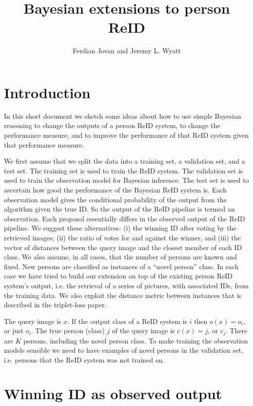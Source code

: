 \documentclass[10pt,a4paper,final]{article}
\title{Bayesian extensions to person ReID}
\author{Ferdian Jovan and Jeremy L. Wyatt}
\begin{document}
\maketitle

\section{Introduction}
In this short document we sketch some ideas about how to use simple Bayesian reasoning to change the outputs of a person ReID system, to change the performance measure, and to improve the performance of that ReID system given that performance measure.

We first assume that we split the data into a training set, a validation set, and a test set. The training set is used to train the ReID system. The validation set is used to train the observation model for Bayesian inference. The test set is used to ascertain how good the performance of the Bayesian ReID system is. Each observation model gives the conditional probability of the output from the algorithm given the true ID. So the output of the ReID pipeline is termed an observation. Each proposal essentially differs in the observed output of the ReID pipeline. We suggest these alternatives: (i) the winning ID after voting by the retrieved images; (ii) the ratio of votes for and against the winner, and (iii) the vector of distances between the query image and the closest member of each ID class. %
We also assume, in all cases, that the number of persons are known and fixed. New persons are classified as instances of a ``novel person'' class. In each case we have tried to build our extension on top of the existing person ReID system's output, i.e. the retrieval of a series of pictures, with associated IDs, from the training data. We also exploit the distance metric between instances that is described in the triplet-loss paper.

The query image is $x$. If the output class of a ReID system is $i$ then $o(x)=o_i$, or just $o_i$.  The true person (class) $j$ of the query image is $c(x)=j$, or $c_j$. There are $K$ persons, including the novel person class. To make training the observation models sensible we need to have examples of novel persons in the validation set, i.e. persons that the ReID system was not trained on.

\section{Winning ID as observed output}
\end{document}
